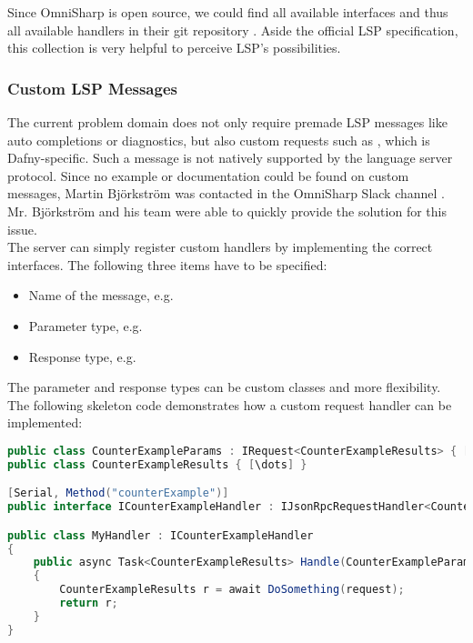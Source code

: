 Since OmniSharp is open source, we could find all available interfaces and thus all available handlers in their git repository \cite{omnisharpgit}.
Aside the official LSP specification, this collection is very helpful to perceive LSP's possibilities.

\subsubsection{Custom LSP Messages}
\label{chapter:customlspmsg}
The current problem domain does not only require premade LSP messages like auto completions or diagnostics, but also custom requests such as , which is Dafny-specific.
Such a message is not natively supported by the language server protocol.
Since no example or documentation could be found on custom messages, Martin Bj\"orkstr\"om was contacted in the OmniSharp Slack channel \cite{omnisharpslack}.
Mr. Bj\"orkstr\"om and his team were able to quickly provide the solution for this issue.\\

The server can simply register custom handlers by implementing the correct interfaces.
The following three items have to be specified:
\begin{itemize}
    \item Name of the message, e.g. 
    \item Parameter type, e.g. 
    \item Response type, e.g. 
\end{itemize}


The parameter and response types can be custom classes and more flexibility.
The following skeleton code demonstrates how a custom request handler can be implemented:

\begin{lstlisting}[language=csharp, caption={LSP Handler Implementation}, captionpos=b, label={lst:lspcustomhandler}]
public class CounterExampleParams : IRequest<CounterExampleResults> { [\dots] }
public class CounterExampleResults { [\dots] }

[Serial, Method("counterExample")]
public interface ICounterExampleHandler : IJsonRpcRequestHandler<CounterExampleParams, CounterExampleResults> { }

public class MyHandler : ICounterExampleHandler
{
    public async Task<CounterExampleResults> Handle(CounterExampleParams request, CancellationToken c)
    {
        CounterExampleResults r = await DoSomething(request);
        return r;
    }
}
\end{lstlisting}


